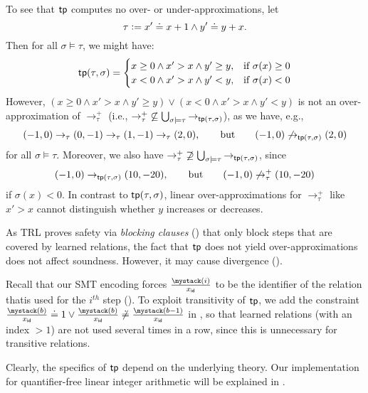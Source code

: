 \begin{example}
  \label{Counterex-tip}
  To see that $\tip$ computes no over- or under-approximations, let
  \[
    \tau \Def x' \doteq x + 1 \land y' \doteq y + x.\paper{\pagebreak[3]}
  \]
  Then for all $\sigma \models \tau$, we might have:
  \[
    \tip(\tau,\sigma) =
    \begin{cases}
      x \geq 0 \land x' > x \land y' \geq y, & \text{if } \sigma(x) \geq 0 \\
      x < 0 \land x' > x \land y' < y,   & \text{if } \sigma(x) < 0
    \end{cases}
  \]
  However, $(x \geq 0 \land x' > x \land y' \geq y) \lor (x < 0 \land x' > x \land y' < y)$ is not an over-approximation of $\to^+_\tau$ (i.e., ${\to^+_\tau} \not\subseteq \bigcup_{\sigma \models \tau}
    {\to_{\tip(\tau,\sigma)}}$), as we have, e.g.,
  \[
    (-1,0) \to_\tau (0,-1) \to_\tau (1,-1) \to_\tau (2,0), \qquad \text{but} \qquad (-1,0) \not\to_{\tip(\tau,\sigma)} (2,0)
  \]
  for all $\sigma \models \tau$.
  Moreover, we also have ${\to^+_\tau} \not\supseteq \bigcup_{\sigma \models \tau} {\to_{\tip(\tau,\sigma)}}$, since
  \[
    (-1,0) \to_{\tip(\tau,\sigma)} (10,-20), \qquad \text{but} \qquad (-1,0) \not\to^+_\tau (10,-20)
  \]
  if $\sigma(x) < 0$.
  In contrast to $\tip(\tau, \sigma)$, linear over-approximations for $\to^+_\tau$ like $x' > x$
  cannot distinguish whether $y$ increases or decreases.
\end{example}

As TRL proves safety via \emph{blocking clauses} () that only block steps that are cov\-er\-ed by learned relations, the fact that $\tip$ does not yield over-ap\-prox\-i\-ma\-tions does not affect soundness.
%
However, it may cause divergence ().

Recall that our SMT encoding forces $\ind[\id]{x}{i}$ to be the identifier of the relation that\linebreak is used for the $i^{th}$ step ().
%
To exploit transitivity of $\tip$, we add the constraint
$\ind[\id]{x}{b} \doteq 1 \lor \ind[\id]{x}{b} \not\doteq \ind[\id]{x}{b-1}$ in
, so that learned relations (with an index $>1$) are not used several times in a row, since this is unnecessary for transitive relations.

Clearly, the specifics of $\tip$ depend on the underlying theory.
%
Our implementation for quantifier-free linear integer arithmetic will be explained in .


